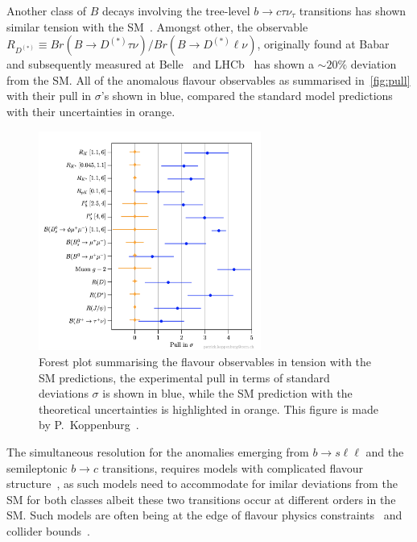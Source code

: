 Another class of $B$ decays involving the tree-level $ b \to c \tau \nu_\tau$ transitions has shown similar tension with the SM~\cite{Azatov:2018knx,Alok:2019uqc,Murgui:2019czp,Shi:2019gxi}. Amongst other, the observable $R_{D^{(*)}} \equiv Br(B \to D^{(*)} \tau \nu) / Br(B \to D^{(*)} \ell \nu)$, originally found at Babar~\cite{Lees:2013uzd} and subsequently measured at Belle~\cite{Huschle:2015rga} and LHCb~\cite{Aaij:2017uff} has shown a $\sim 20\%$ deviation from the SM. All of the anomalous flavour observables as summarised in~\autoref{fig:pull} with their pull in $\sigma$'s shown in blue,  compared the standard model predictions with their uncertainties in orange. \\
 \begin{figure}[ht!]
 	\centering
 	\includegraphics[width=0.65\textwidth]{fig/pull}
 	\caption{ Forest plot summarising the flavour observables in tension with the SM predictions, the experimental pull in terms of standard deviations $\sigma$ is shown in blue, while the SM prediction with the theoretical uncertainties is highlighted in orange. This figure is made by P.~Koppenburg~\cite{Koppenburg:2767155}. }
 	\label{fig:pull}
 \end{figure}
The simultaneous resolution for the anomalies emerging from $ b \to s \ell \ell$ and the semileptonic $b \to c$ transitions, requires models with complicated flavour structure~\cite{DiLuzio:2017vat,Calibbi:2017qbu,Bordone:2017bld,Barbieri:2017tuq,Assad:2017iib,Heeck:2018ntp,Fornal:2018dqn,Crivellin:2018yvo,Crivellin:2019dwb,Bordone:2019uzc}, as such models need to accommodate for imilar deviations from the SM for both classes albeit these two transitions occur at different orders in the SM. Such models are often being at the edge of flavour physics constraints~\cite{Bona:2007vi,Silvestrini:2018dos} and collider bounds~\cite{Greljo:2017vvb,Baker:2019sli}.
